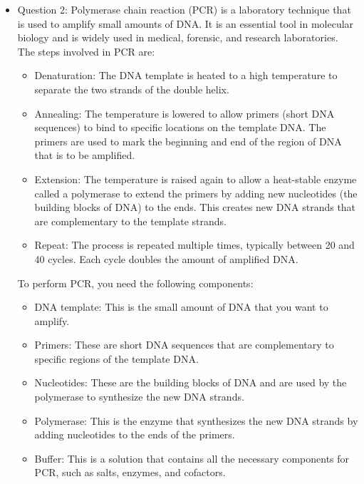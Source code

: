 \documentclass{article}
\begin{document}
\begin{itemize}
    \item Question 2:
Polymerase chain reaction (PCR) is a laboratory technique that is used to amplify small amounts of DNA. It is an essential tool in molecular biology and is widely used in medical, forensic, and research laboratories.\\

The steps involved in PCR are:
\begin{itemize}
\item Denaturation: The DNA template is heated to a high temperature to separate the two strands of the double helix.

\item Annealing: The temperature is lowered to allow primers (short DNA sequences) to bind to specific locations on the template DNA. The primers are used to mark the beginning and end of the region of DNA that is to be amplified.

\item Extension: The temperature is raised again to allow a heat-stable enzyme called a polymerase to extend the primers by adding new nucleotides (the building blocks of DNA) to the ends. This creates new DNA strands that are complementary to the template strands.
\item Repeat: The process is repeated multiple times, typically between 20 and 40 cycles. Each cycle doubles the amount of amplified DNA.
\end{itemize}

To perform PCR, you need the following components:
\begin{itemize}
\item DNA template: This is the small amount of DNA that you want to amplify.
\item Primers: These are short DNA sequences that are complementary to specific regions of the template DNA.

\item Nucleotides: These are the building blocks of DNA and are used by the polymerase to synthesize the new DNA strands.

\item Polymerase: This is the enzyme that synthesizes the new DNA strands by adding nucleotides to the ends of the primers.

\item Buffer: This is a solution that contains all the necessary components for PCR, such as salts, enzymes, and cofactors.
\end{itemize}


\end{itemize}
\end{document}
